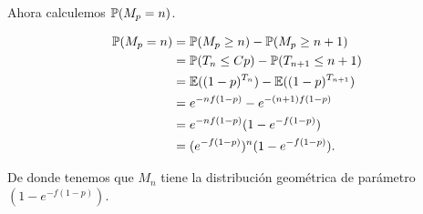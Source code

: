     Ahora calculemos $\mathbb{P}(M_p = n)$.\par\null
    
    \begin{align}
        \mathbb{P}(M_p = n)    &=  \mathbb{P}(M_p \geq n) - \mathbb{P}(M_p \geq n + 1)       \\
                        &=  \mathbb{P}(T_n \leq Cp)- \mathbb{P}(T_{n+1} \leq n + 1)   \\
                        &=  \mathbb{E}((1-p)^{T_n}) - \mathbb{E}((1-p)^{T_{n+1}})       \\
                        &=  e^{-nf(1-p)}    - e^{-(n+1)f(1-p)}          \\
                        &=  e^{-nf(1-p)} (1- e^{-f(1-p)})               \\
                        &=  (e^{-f(1-p)})^n (1- e^{-f(1-p)}).           
    \end{align}\par\null
    
    De donde tenemos que $M_n$ tiene la distribución geométrica de parámetro $(1- e^{-f(1-p)})$.